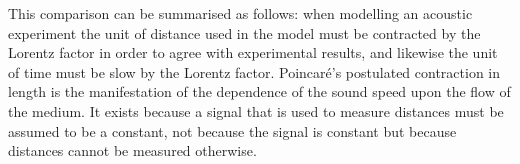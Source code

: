 \documentclass[10pt, fleqn,final,showtrims,oldfontcommands, article,a4paper,oneside]{memoir} %
\newcommand{\eqnref}[1]{\ref{eqn:#1}}
\newcommand{\Poincare}{Poincar{\'e}}
\begin{document}
This comparison can be summarised as follows:
when modelling an acoustic experiment 
the  unit of distance used in the model must be
contracted by the Lorentz factor in order to agree with experimental results,
and likewise the unit of time must be slow by the Lorentz factor.
\Poincare's postulated contraction in length is the manifestation of the dependence of the sound speed upon
the flow of the medium.
It  exists because a  signal that is used to measure distances must be assumed to be a constant,
not because the signal is constant but because distances cannot be measured otherwise.




\end{document}
